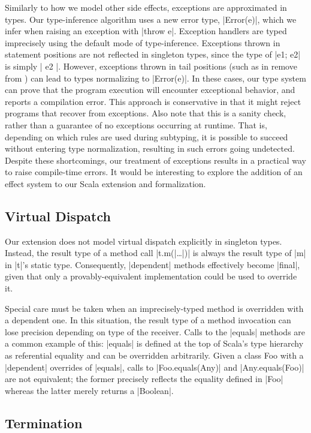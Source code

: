 Similarly to how we model other side effects, exceptions are approximated in types.
Our type-inference algorithm uses a new error type, |Error(e)|, which we infer when raising an exception with |throw e|.
Exception handlers are typed imprecisely using the default mode of type-inference.
Exceptions thrown in statement positions are not reflected in singleton types, since the type of |{e1; e2}| is simply |{ e2 }|.
However, exceptions thrown in tail positions (such as in remove from ) can lead to types normalizing to |Error(e)|.
In these cases, our type system can prove that the program execution will encounter exceptional behavior, and reports a compilation error.
This approach is conservative in that it might reject programs that recover from exceptions.
Also note that this is a sanity check, rather than a guarantee of no exceptions occurring at runtime.
That is, depending on which rules are used during subtyping, it is possible to succeed without entering type normalization, resulting in such errors going undetected.
Despite these shortcomings, our treatment of exceptions results in a practical way to raise compile-time errors.
It would be interesting to explore the addition of an effect system to our Scala extension and formalization.

\subsection{Virtual Dispatch}

Our extension does not model virtual dispatch explicitly in singleton types.
Instead, the result type of a method call |t.m(|\ldots{}|)| is always the result type of |m| in |t|'s static type.
Consequently, |dependent| methods effectively become |final|, given that only a provably-equivalent implementation could be used to override it.

Special care must be taken when an imprecisely-typed method is overridden with a dependent one.
In this situation, the result type of a method invocation can lose precision depending on type of the receiver.
Calls to the |equals| methods are a common example of this: |equals| is defined at the top of Scala's type hierarchy as referential equality and can be overridden arbitrarily.
Given a class Foo with a |dependent| overrides of |equals|, calls to |Foo.equals(Any)| and |Any.equals(Foo)| are not equivalent; the former precisely reflects the equality defined in |Foo| whereas the latter merely returns a |Boolean|.

\subsection{Termination}

